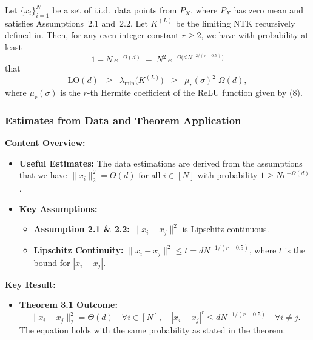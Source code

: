 \documentclass[serif, aspectratio=169]{beamer}
\begin{document}
\begin{frame}
	\begin{theorem}
		\label{thm:smallest-eig-NTK}
		Let $\{x_i\}_{i=1}^N$ be a set of i.i.d.\ data points from $P_X$, where $P_X$ has 
		zero mean and satisfies Assumptions~2.1 and~2.2. Let $K^{(L)}$ be the limiting 
		NTK recursively defined in. Then, for any even integer constant $r \ge 2$, 
		we have with probability at least 
		\[
		1 - N\,e^{-\Omega(d)} \;-\; N^2\,e^{-\Omega\bigl(d\,N^{-2/(\,r - 0.5\,)}\bigr)}
		\]
		that
		\[
		\mathrm{LO}(d) 
		\;\;\ge\;\;
		\lambda_{\min}\bigl(K^{(L)}\bigr) 
		\;\;\ge\;\;
		\mu_{r}(\sigma)^{2}\;\Omega(d),
		\]
		where $\mu_{r}(\sigma)$ is the $r$-th Hermite coefficient of the ReLU function 
		given by (8).
	\end{theorem}
\end{frame}





\begin{frame}
\frametitle{Estimates from Data and Theorem Application}

\textbf{Content Overview:}
\begin{itemize}
	\item \textbf{Useful Estimates:}
	The data estimations are derived from the assumptions that we have \( \| x_i \|^2_2 = \Theta(d) \) for all \( i \in [N] \) with probability \( 1 \geq N e^{-\Omega(d)} \).
	\item \textbf{Key Assumptions:}
	\begin{itemize}
		\item \textbf{Assumption 2.1 \& 2.2:} \( \| x_i - x_j \|^2 \) is Lipschitz continuous.
		\item \textbf{Lipschitz Continuity:} \( \| x_i - x_j \|^2 \leq t = dN^{-1/(r-0.5)} \), where \( t \) is the bound for \( |x_i - x_j| \).
	\end{itemize}
\end{itemize}

\vspace{0.5cm}

\textbf{Key Result:}
\begin{itemize}
	\item \textbf{Theorem 3.1 Outcome:}  
	\[
	\| x_i - x_j \|^2_2 = \Theta(d) \quad \forall i \in [N], \quad |x_i - x_j|^{r} \leq dN^{-1/(r-0.5)} \quad \forall i \neq j.
	\]
	The equation holds with the same probability as stated in the theorem.
\end{itemize}

\end{frame}
\end{document}
